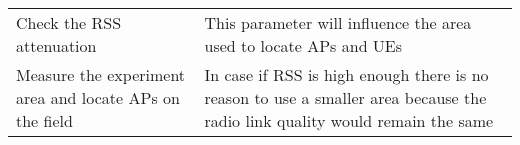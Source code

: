 \begin{longtable}[]{@{}ll@{}}
\begin{minipage}[t]{0.27\columnwidth}\raggedright
Check the RSS attenuation\strut
\end{minipage} & \begin{minipage}[t]{0.67\columnwidth}\raggedright
This parameter will influence the area used to locate APs and UEs\strut
\end{minipage}\tabularnewline
\begin{minipage}[t]{0.27\columnwidth}\raggedright
Measure the experiment area and locate APs on the field\strut
\end{minipage} & \begin{minipage}[t]{0.67\columnwidth}\raggedright
In case if RSS is high enough there is no reason to use a smaller area
because the radio link quality would remain the same\strut
\end{minipage}\tabularnewline
\bottomrule
\end{longtable}
